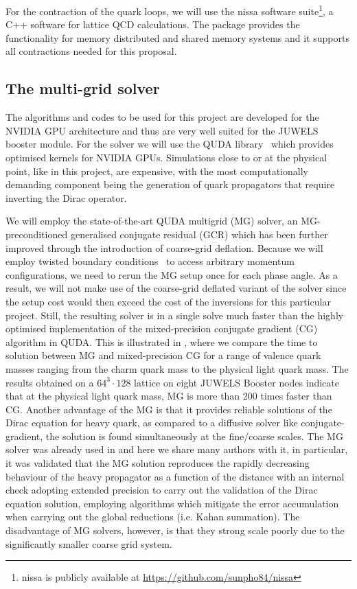For the contraction of the quark loops, we will use the nissa software
suite\footnote{nissa is publicly available at
\url{https://github.com/sunpho84/nissa}}, a C++  software for lattice
QCD calculations. The package provides the functionality for memory
distributed and shared memory systems and it supports all contractions 
needed for this proposal.

\subsection{The multi-grid solver}

The algorithms and codes to be used for this project are developed  for the NVIDIA GPU architecture
and thus are very well suited for the JUWELS booster module. For the solver we will use the QUDA library~\cite{Clark:2009wm,Babich:2011np,Clark:2016rdz} which provides optimised kernels for NVIDIA GPUs.
Simulations close to or at the physical point, like in this project, are  expensive, with the most computationally demanding component being the generation of quark propagators that require inverting the Dirac operator.

We will employ the state-of-the-art QUDA multigrid (MG) solver, an MG-preconditioned generalised conjugate residual (GCR) which has been further improved through the introduction of coarse-grid deflation.
Because we will employ twisted boundary conditions~\cite{deDivitiis:2004kq} to access arbitrary momentum configurations, we need to rerun the MG setup once for each phase angle.
As a result, we will not make use of the coarse-grid deflated variant of the solver since the setup cost would then exceed the cost of the inversions for this particular project.
Still, the resulting solver is in a single solve much faster than the highly optimised implementation of the mixed-precision conjugate gradient (CG) algorithm in QUDA.
This is illustrated in , where we compare the time to solution between MG and mixed-precision CG for a range of valence quark masses ranging from the charm quark mass to the physical light quark mass.
The results obtained on a $64^3 \cdot 128$ lattice on eight JUWELS Booster nodes indicate that at the physical light quark mass, MG is more than 200 times faster than CG.
Another advantage of the MG  is that it provides reliable solutions
of the Dirac equation for heavy quark, as compared to a diffusive
solver like conjugate-gradient, the solution is found simultaneously at the fine/coarse scales. 
The MG solver was already used in \cite{Frezzotti:2024kqk} and here we share many authors with it,
in particular, it was validated that the MG solution reproduces the
rapidly decreasing behaviour of the heavy propagator as a function of the distance with an 
internal check adopting extended precision to carry out the validation of the Dirac equation solution,
employing algorithms which mitigate the error accumulation when carrying out the global reductions
(i.e. Kahan summation).
The disadvantage of MG solvers, however, is that they strong scale poorly due to the significantly smaller coarse grid system.

